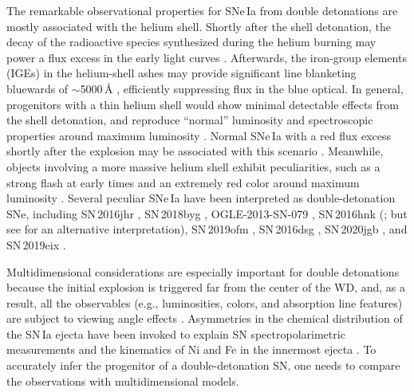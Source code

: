 \documentclass[twocolumn]{aastex631}
\begin{document}
\begin{CJK*}{UTF8}{gbsn}
The remarkable observational properties for SNe\,Ia from double detonations are mostly associated with the helium shell. Shortly after the shell detonation, the decay of the radioactive species synthesized during the helium burning may power a flux excess in the early light curves \citep{Woosley_1994,Fink_DD_2010,Kromer_DD_2010}. Afterwards, the iron-group elements (IGEs) in the helium-shell ashes may provide significant line blanketing bluewards of $\sim$5000\,\r{A} \citep{Kromer_DD_2010}, efficiently suppressing flux in the blue optical. In general, progenitors with a thin helium shell would show minimal detectable effects from the shell detonation, and reproduce ``normal'' \citep[e.g., that of SN\,2011fe;][]{Nugent_11fe_2011} luminosity and spectroscopic properties around maximum luminosity \citep[e.g.,][]{polin_observational_2019, Townsley_2019,Magee_2021,Shen_2D_2021}. Normal SNe\,Ia with a red flux excess shortly after the explosion may be associated with this scenario \citep[e.g., SN\,2018aoz;][]{Ni_2022}. Meanwhile, objects involving a more massive helium shell exhibit peculiarities, such as a strong flash at early times and an extremely red color around maximum luminosity \citep{polin_observational_2019}. Several peculiar SNe\,Ia have been interpreted as double-detonation SNe, including SN\,2016jhr \citep{jiang_16jhr_2017}, SN\,2018byg \citep{de_18byg_2019}, OGLE-2013-SN-079 \citep[][interpreted as either a pure helium-shell detonation or a double detonation]{Inserra_OGLE13_079_2015}, SN\,2016hnk (\citealp{jacobson-galan_16hnk_2020,de_Ca_rich_2020}; but see \citealp{galbany_16hnk_2019} for an alternative interpretation), SN\,2019ofm \citep{de_Ca_rich_2020}, SN\,2016dsg \citep{Dong_16dsg_2022}, SN\,2020jgb \citep{Liu_20jgb_2023}, and SN\,2019eix \citep{Gonzalez_19eix_2023}.

Multidimensional considerations are especially important for double detonations because the initial explosion is triggered far from the center of the WD, and, as a result, all the observables (e.g., luminosities, colors, and absorption line features) are subject to viewing angle effects \citep{Fink_DD_2010,Shen_2D_2021}. Asymmetries in the chemical distribution of the SN\,Ia ejecta have been invoked to explain SN spectropolarimetric measurements \citep[e.g.,][see \citealp{Wang_2008} for a review]{Wang_2003,Kasen_2003, Patat_2012} and the kinematics of Ni and Fe in the innermost ejecta \citep{Motohara_2006,Maeda_2010b,Maeda_2010,Maguire_2018,Li_2021}. To accurately infer the progenitor of a double-detonation SN, one needs to compare the observations with multidimensional models.


\end{CJK*}
\end{document}
